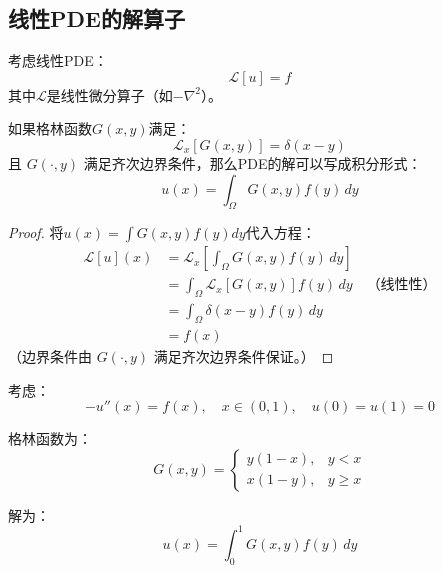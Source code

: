 \subsection{线性PDE的解算子}

考虑线性PDE：
\begin{equation}
    \mathcal{L}[u] = f
\end{equation}
其中$\mathcal{L}$是线性微分算子（如$-\nabla^2$）。

\begin{theorem}[格林函数表示]
\label{thm:green}
如果格林函数$G(x, y)$满足：
\begin{equation}
    \mathcal{L}_x[G(x, y)] = \delta(x - y)
\end{equation}
且 $G(\cdot, y)$ 满足齐次边界条件，那么PDE的解可以写成积分形式：
\begin{equation}
    u(x) = \int_\Omega G(x, y) f(y) \, dy
\end{equation}
\end{theorem}

\begin{proof}
将$u(x) = \int G(x, y) f(y) dy$代入方程：
\begin{align}
    \mathcal{L}[u](x) &= \mathcal{L}_x\left[\int_\Omega G(x, y) f(y) \, dy\right] \\
    &= \int_\Omega \mathcal{L}_x[G(x, y)] f(y) \, dy \quad \text{（线性性）} \\
    &= \int_\Omega \delta(x - y) f(y) \, dy \\
    &= f(x)
\end{align}
（边界条件由 $G(\cdot, y)$ 满足齐次边界条件保证。）
\end{proof}

\begin{example}[一维泊松方程的格林函数]
考虑：
\begin{equation}
    -u''(x) = f(x), \quad x \in (0, 1), \quad u(0) = u(1) = 0
\end{equation}

格林函数为：
\begin{equation}
    G(x, y) = \begin{cases}
        y(1-x), & y < x \\
        x(1-y), & y \geq x
    \end{cases}
\end{equation}

解为：
\begin{equation}
    u(x) = \int_0^1 G(x, y) f(y) \, dy
\end{equation}
\end{example}

